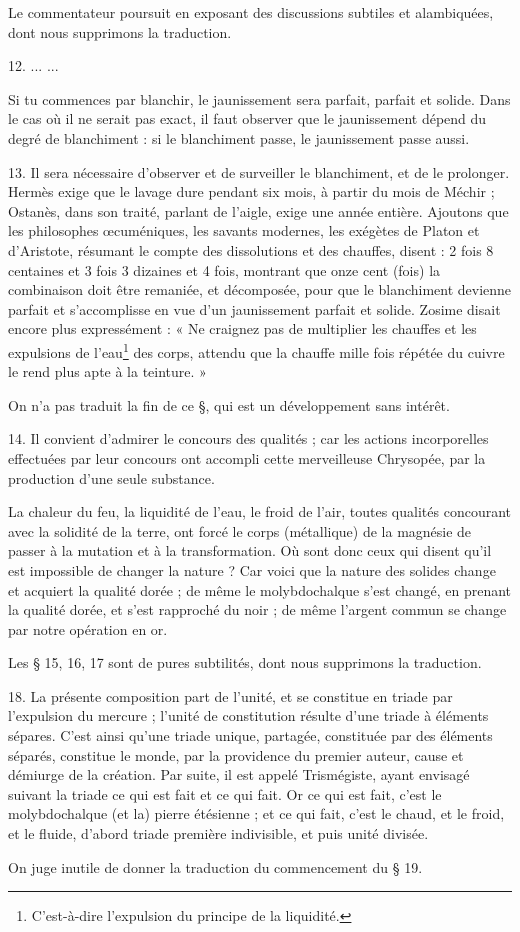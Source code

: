\documentclass[landscape, a4paper, 11pt, oneside, polutonikogreek, french]{article}
\begin{document}
Le commentateur poursuit en exposant des discussions subtiles et alambiquées, dont nous supprimons la traduction.

12. ... ...

Si tu commences par blanchir, le jaunissement sera parfait, parfait et solide. Dans le cas où il ne serait pas exact, il faut observer que le jaunissement dépend du degré de blanchiment : si le blanchiment passe, le jaunissement passe aussi.

13. Il sera nécessaire d'observer et de surveiller le blanchiment, et de le prolonger. Hermès exige que le lavage dure pendant six mois, à partir du mois de Méchir ; Ostanès, dans son traité, parlant de l'aigle, exige une année entière. Ajoutons que les philosophes œcuméniques, les savants modernes, les exégètes de Platon et d'Aristote, résumant le compte des dissolutions et des chauffes, disent : 2 fois 8 centaines et 3 fois 3 dizaines et 4 fois, montrant que onze cent (fois) la combinaison doit être remaniée, et décomposée, pour que le blanchiment devienne parfait et s'accomplisse en vue d'un jaunissement parfait et solide. Zosime disait encore plus expressément : « Ne craignez pas de multiplier les chauffes et les expulsions de l'eau\footnote{C'est-à-dire l'expulsion du principe de la liquidité.} des corps, attendu que la chauffe mille fois répétée du cuivre le rend plus apte à la teinture. »

On n'a pas traduit la fin de ce §, qui est un développement sans intérêt.

14. Il convient d'admirer le concours des qualités ; car les actions incorporelles effectuées par leur concours ont accompli cette merveilleuse Chrysopée, par la production d'une seule substance.

La chaleur du feu, la liquidité de l'eau, le froid de l'air, toutes qualités concourant avec la solidité de la terre, ont forcé le corps (métallique) de la magnésie de passer à la mutation et à la transformation. Où sont donc ceux qui disent qu'il est impossible de changer la nature ? Car voici que la nature des solides change et acquiert la qualité dorée ; de même le molybdochalque s'est changé, en prenant la qualité dorée, et s'est rapproché du noir ; de même l'argent commun se change par notre opération en or.

Les § 15, 16, 17 sont de pures subtilités, dont nous supprimons la traduction.

18. La présente composition part de l'unité, et se constitue en triade par l'expulsion du mercure ; l'unité de constitution résulte d'une triade à éléments sépares. C'est ainsi qu'une triade unique, partagée, constituée par des éléments séparés, constitue le monde, par la providence du premier auteur, cause et démiurge de la création. Par suite, il est appelé Trismégiste, ayant envisagé suivant la triade ce qui est fait et ce qui fait. Or ce qui est fait, c'est le molybdochalque (et la) pierre étésienne ; et ce qui fait, c'est le chaud, et le froid, et le fluide, d'abord triade première indivisible, et puis unité divisée.
\begin{center}
On juge inutile de donner la traduction du commencement du § 19.
\end{center}
\end{document}
